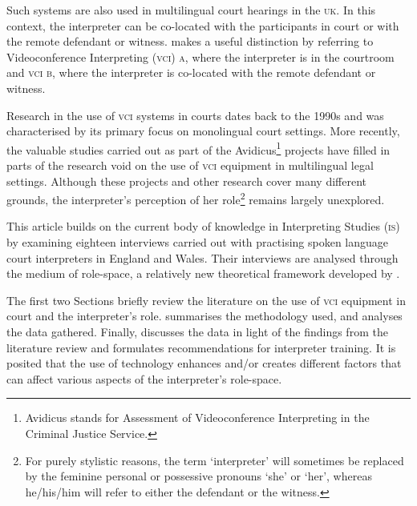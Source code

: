\documentclass[output=paper]{langsci/langscibook}
\begin{document}
Such systems are also used in multilingual court hearings in the \textsc{uk}. In this context, the interpreter can be co-located with the participants in court or with the remote defendant or witness. \citet{Braun2011a} makes a useful distinction by referring to Videoconference Interpreting (\textsc{vci}) \textsc{a}, where the interpreter is in the courtroom and \textsc{vci b}, where the interpreter is co-located with the remote defendant or witness. 

Research in the use of \textsc{vci} systems in courts dates back to the 1990s and was characterised by its primary focus on monolingual court settings. More recently, the valuable studies carried out as part of the Avidicus\footnote{Avidicus stands for Assessment of Videoconference Interpreting in the Criminal Justice Service.}  projects have filled in parts of the research void on the use of \textsc{vci} equipment in multilingual legal settings. Although these projects and other research cover many different grounds, the interpreter’s perception of her role\footnote{For purely stylistic reasons, the term ‘interpreter’ will sometimes be replaced by the feminine personal or possessive pronouns ‘she’ or ‘her’, whereas he/his/him will refer to either the defendant or the witness.} remains largely unexplored. 

This article builds on the current body of knowledge in Interpreting Studies (\textsc{is}) by examining eighteen interviews carried out with practising spoken language court interpreters in England and Wales. Their interviews are analysed through the medium of role-space, a relatively new theoretical framework developed by \citet{Llewellyn-Jones2014}.

The first two Sections briefly review the literature on the use of \textsc{vci} equipment in court and the interpreter’s role.  summarises the methodology used, and  analyses the data gathered. Finally,  discusses the data in light of the findings from the literature review and formulates recommendations for interpreter training. It is posited that the use of technology enhances and/or creates different factors that can affect various aspects of the interpreter’s role-space.  
\end{document}
